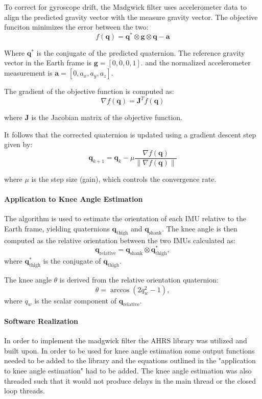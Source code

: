 To correct for gyroscope drift, the Madgwick filter uses accelerometer data to align the predicted gravity vector with the measure gravity vector. The objective funciton minimizes the error between the two:
\[
f(\mathbf{q}) = \mathbf{q}^* \otimes \mathbf{g} \otimes \mathbf{q} - \mathbf{a}
\]

Where  \( \mathbf{q}^* \) is the conjugate of the predicted quaternion. The reference gravity vector in the Earth frame is \(\mathbf{g} = [0, 0, 0, 1].\) and the normalized accelerometer measurement is
    \(
    \mathbf{a} = [0, a_x, a_y, a_z].
    \)

The gradient of the objective function is computed as:
\[
\nabla f(\mathbf{q}) = \mathbf{J}^T f(\mathbf{q})
\]

where \( \mathbf{J} \) is the Jacobian matrix of the objective function.

It follows that the corrected quaternion is updated using a gradient descent step given by:
\[
\mathbf{q}_{k+1} = \mathbf{q}_k - \mu \frac{\nabla f(\mathbf{q})}{\|\nabla f(\mathbf{q})\|}
\]

where \( \mu \) is the step size (gain), which controls the convergence rate.
\newline

\paragraph*{Application to Knee Angle Estimation}

 The algorithm is used to estimate the orientation of each IMU relative to the Earth frame, yielding quaternions \( \mathbf{q}_{\text{thigh}} \) and \( \mathbf{q}_{\text{shank}} \). The knee angle is then computed as the relative orientation between the two IMUs calculated as:
\[
\mathbf{q}_{\text{relative}} = \mathbf{q}_{\text{shank}} \otimes \mathbf{q}_{\text{thigh}}^*,
\]
where \( \mathbf{q}_{\text{thigh}}^* \) is the conjugate of \( \mathbf{q}_{\text{thigh}} \).

The knee angle \( \theta \) is derived from the relative orientation quaternion:
\[
\theta = \arccos{\left( 2q_w^2 - 1 \right)},
\]
where \( q_w \) is the scalar component of \( \mathbf{q}_{\text{relative}} \).

\paragraph*{Software Realization}
In order to implement the madgwick filter the AHRS library was utilized \cite{noauthor_madgwick_nodate} and built upon. In order to be used for knee angle estimation some output functions needed to be added to the library and the equations outlined in the "application to knee angle estimation" had to be added. The knee angle estimation was also threaded such that it would not produce delays in the main thread or the closed loop threads. 

